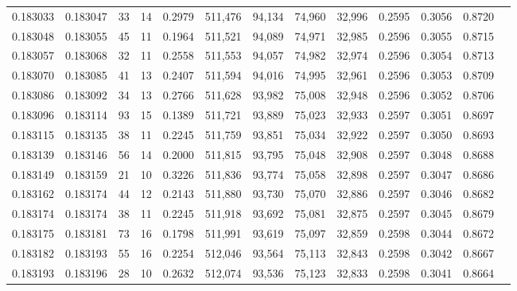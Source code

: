 \begin{tabular}{rrrrrrrrrrrrr}
0.183033 & 0.183047 &    33 &  14 &                                     0.2979 & 511,476 &  94,134 &  74,960 &  32,996 & 0.2595 & 0.3056 & 0.8720 \\
0.183048 & 0.183055 &    45 &  11 &                                     0.1964 & 511,521 &  94,089 &  74,971 &  32,985 & 0.2596 & 0.3055 & 0.8715 \\
0.183057 & 0.183068 &    32 &  11 &                                     0.2558 & 511,553 &  94,057 &  74,982 &  32,974 & 0.2596 & 0.3054 & 0.8713 \\
0.183070 & 0.183085 &    41 &  13 &                                     0.2407 & 511,594 &  94,016 &  74,995 &  32,961 & 0.2596 & 0.3053 & 0.8709 \\
0.183086 & 0.183092 &    34 &  13 &                                     0.2766 & 511,628 &  93,982 &  75,008 &  32,948 & 0.2596 & 0.3052 & 0.8706 \\
0.183096 & 0.183114 &    93 &  15 &                                     0.1389 & 511,721 &  93,889 &  75,023 &  32,933 & 0.2597 & 0.3051 & 0.8697 \\
0.183115 & 0.183135 &    38 &  11 &                                     0.2245 & 511,759 &  93,851 &  75,034 &  32,922 & 0.2597 & 0.3050 & 0.8693 \\
0.183139 & 0.183146 &    56 &  14 &                                     0.2000 & 511,815 &  93,795 &  75,048 &  32,908 & 0.2597 & 0.3048 & 0.8688 \\
0.183149 & 0.183159 &    21 &  10 &                                     0.3226 & 511,836 &  93,774 &  75,058 &  32,898 & 0.2597 & 0.3047 & 0.8686 \\
0.183162 & 0.183174 &    44 &  12 &                                     0.2143 & 511,880 &  93,730 &  75,070 &  32,886 & 0.2597 & 0.3046 & 0.8682 \\
0.183174 & 0.183174 &    38 &  11 &                                     0.2245 & 511,918 &  93,692 &  75,081 &  32,875 & 0.2597 & 0.3045 & 0.8679 \\
0.183175 & 0.183181 &    73 &  16 &                                     0.1798 & 511,991 &  93,619 &  75,097 &  32,859 & 0.2598 & 0.3044 & 0.8672 \\
0.183182 & 0.183193 &    55 &  16 &                                     0.2254 & 512,046 &  93,564 &  75,113 &  32,843 & 0.2598 & 0.3042 & 0.8667 \\
0.183193 & 0.183196 &    28 &  10 &                                     0.2632 & 512,074 &  93,536 &  75,123 &  32,833 & 0.2598 & 0.3041 & 0.8664 \\

\end{tabular}
